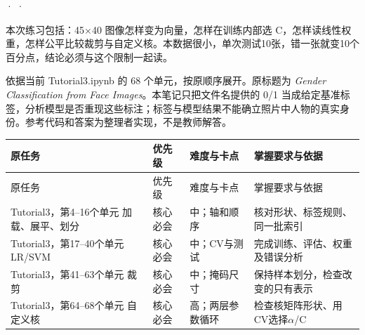 






 ·  · 





本次练习包括：45\ensuremath{\times}40 图像怎样变为向量，怎样在训练内部选 C，怎样读线性权重，怎样公平比较裁剪与自定义核。本数据很小，单次测试10张，错一张就变10个百分点，结论必须与这个限制一起读。

依据当前 Tutorial3.ipynb 的 68 个单元，按原顺序展开。原标题为 \emph{Gender Classification from Face Images}。本笔记只把文件名提供的 0/1 当成给定基准标签，分析模型是否重现这些标注；标签与模型结果不能确立照片中人物的真实身份。参考代码和答案为整理者实现，不是教师解答。


\begingroup
\small\setlength{\tabcolsep}{3pt}
\renewcommand{\arraystretch}{1.22}
\begin{longtable}{@{}>{\raggedright\arraybackslash}p{}>{\raggedright\arraybackslash}p{}>{\raggedright\arraybackslash}p{}>{\raggedright\arraybackslash}p{}@{}}
\toprule
原任务 & 优先级 & 难度与卡点 & 掌握要求与依据 \\
\midrule\endfirsthead
原任务 & 优先级 & 难度与卡点 & 掌握要求与依据 \\
\midrule\endhead
\bottomrule\endfoot
Tutorial3，第4–16个单元 加载、展平、划分 & 核心必会 & 中；轴和顺序 & 核对形状、标签规则、同一批索引 \\
Tutorial3，第17–40个单元 LR/SVM & 核心必会 & 中；CV与测试 & 完成训练、评估、权重及错误分析 \\
Tutorial3，第41–63个单元 裁剪 & 核心必会 & 中；掩码尺寸 & 保持样本划分，检查改变的只有表示 \\
Tutorial3，第64–68个单元 自定义核 & 核心必会 & 高；两层参数循环 & 检查核矩阵形状、用CV选择\ensuremath{\alpha}/C \\
\end{longtable}
\endgroup


